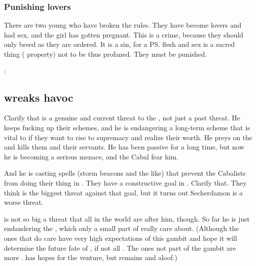 





\subsubsection{Punishing lovers}
There are two young \humans{} who have broken the rules. 
They have become lovers and had sex, and the girl has gotten pregnant. 
This is a crime, because they should only breed as they are ordered. 
It is a sin, for a \ps{\human} flesh and sex is a sacred thing (\resphan{} property) not to be thus profaned. 
They must be punished. 

\Teshrial: 









\subsection{\Ishnaruchaefir wreaks havoc}
Clarify that \Ishnaruchaefir is a genuine and current threat to the \resphain, not just a past threat.
He keeps fucking up their schemes, and he is endangering a long-term scheme that is vital to \CiriathSepher if they want to rise to supremacy and realize their worth.
He preys on the \resphain and kills them and their servants. 
He has been passive for a long time, but now he is becoming a serious menace, and the Cabal fear him.

And he is casting spells (storm beacons and the like) that prevent the Cabalists from doing their thing in \Malcur.
They have a constructive goal in \Malcur. 
Clarify that.
They think \Ishnaruchaefir is the biggest threat against that goal, but it turns out Secherdamon is a worse threat. 

\Ishnaruchaefir is not so big a threat that all \resphain in the world are after him, though.
So far he is just endandering the , which only a small part of \CiriathSepher really care about. 
(Although the ones that do care have very high expectations of this gambit and hope it will determine the future fate of \CiriathSepher, if not all \resphain. 
 The ones not part of the gambit are more \skeptical. 
 \Azraid has hopes for the venture, but remains \skeptical and aloof.)

